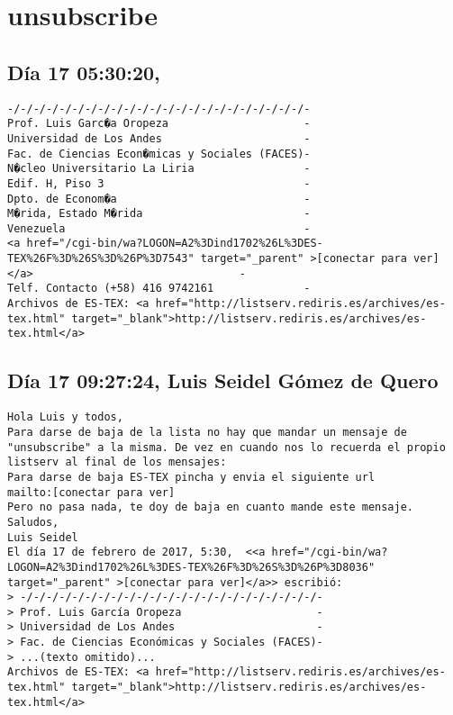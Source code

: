 \documentclass[a4paper,10pt]{article}
\begin{document}
\section{unsubscribe}

\subsection{Día 17 05:30:20, }

\begin{lstlisting}
-/-/-/-/-/-/-/-/-/-/-/-/-/-/-/-/-/-/-/-/-/-/-/-
Prof. Luis Garc�a Oropeza                     -
Universidad de Los Andes                      -
Fac. de Ciencias Econ�micas y Sociales (FACES)-
N�cleo Universitario La Liria                 -
Edif. H, Piso 3                               -
Dpto. de Econom�a                             -
M�rida, Estado M�rida                         -
Venezuela                                     -
<a href="/cgi-bin/wa?LOGON=A2%3Dind1702%26L%3DES-TEX%26F%3D%26S%3D%26P%3D7543" target="_parent" >[conectar para ver]</a>                                -
Telf. Contacto (+58) 416 9742161              -
Archivos de ES-TEX: <a href="http://listserv.rediris.es/archives/es-tex.html" target="_blank">http://listserv.rediris.es/archives/es-tex.html</a>

\end{lstlisting}

\subsection{Día 17 09:27:24, Luis Seidel Gómez de Quero}

\begin{lstlisting}
Hola Luis y todos,
Para darse de baja de la lista no hay que mandar un mensaje de
"unsubscribe" a la misma. De vez en cuando nos lo recuerda el propio
listserv al final de los mensajes:
Para darse de baja ES-TEX pincha y envia el siguiente url
mailto:[conectar para ver]
Pero no pasa nada, te doy de baja en cuanto mande este mensaje.
Saludos,
Luis Seidel
El día 17 de febrero de 2017, 5:30,  <<a href="/cgi-bin/wa?LOGON=A2%3Dind1702%26L%3DES-TEX%26F%3D%26S%3D%26P%3D8036" target="_parent" >[conectar para ver]</a>> escribió:
> -/-/-/-/-/-/-/-/-/-/-/-/-/-/-/-/-/-/-/-/-/-/-/-
> Prof. Luis García Oropeza                     -
> Universidad de Los Andes                      -
> Fac. de Ciencias Económicas y Sociales (FACES)-
> ...(texto omitido)...
Archivos de ES-TEX: <a href="http://listserv.rediris.es/archives/es-tex.html" target="_blank">http://listserv.rediris.es/archives/es-tex.html</a>

\end{lstlisting}
\end{document}
